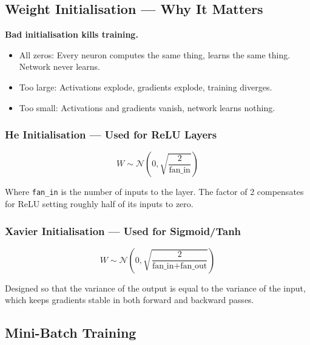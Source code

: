 \documentclass[12pt, a4paper]{article}
\begin{document}
\subsection{Weight Initialisation --- Why It Matters}

\textbf{Bad initialisation kills training.}
\begin{itemize}
  \item All zeros: Every neuron computes the same thing, learns the same thing. Network never learns.
  \item Too large: Activations explode, gradients explode, training diverges.
  \item Too small: Activations and gradients vanish, network learns nothing.
\end{itemize}

\subsubsection{He Initialisation --- Used for ReLU Layers}

\begin{equation}
  W \sim \mathcal{N}\left(0, \sqrt{\frac{2}{\text{fan\_in}}}\right)
\end{equation}

Where \texttt{fan\_in} is the number of inputs to the layer. The factor of 2 compensates for ReLU setting roughly half of its inputs to zero.

\subsubsection{Xavier Initialisation --- Used for Sigmoid/Tanh}

\begin{equation}
  W \sim \mathcal{N}\left(0, \sqrt{\frac{2}{\text{fan\_in} + \text{fan\_out}}}\right)
\end{equation}

Designed so that the variance of the output is equal to the variance of the input, which keeps gradients stable in both forward and backward passes.

\subsection{Mini-Batch Training}
\end{document}
